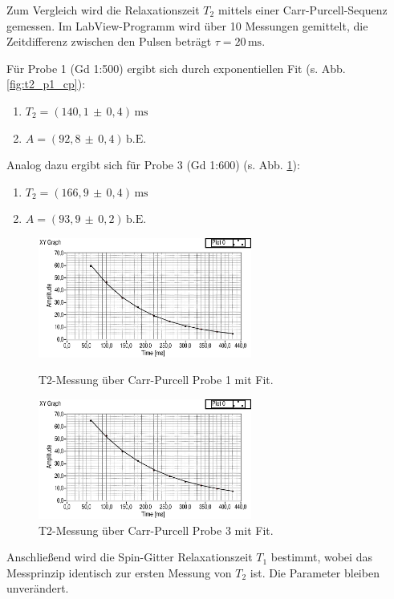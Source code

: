 \documentclass[a4paper]{scrartcl} %
\newcommand{\err}[2]{( #1 \, \pm \, #2 )} %
\newcommand{\ms}{\, \mathrm{ms}}
\newcommand{\be}{\, \mathrm{b.E.}}
\begin{document}
Zum Vergleich wird die Relaxationszeit $T_2$ mittels einer Carr-Purcell-Sequenz gemessen. Im LabView-Programm wird über 10 Messungen gemittelt, die Zeitdifferenz zwischen den Pulsen beträgt $\tau = 20\ms$.

Für Probe 1 (Gd 1:500) ergibt sich durch exponentiellen Fit (s. Abb. \ref{fig:t2_p1_cp}):
\begin{enumerate}
	\item[] $T_2 = \err{140,1}{0,4} \ms$
	\item[] $A = \err{92,8}{0,4} \be$
\end{enumerate}
Analog dazu ergibt sich für Probe 3 (Gd 1:600) (s. Abb. \ref{fig:t2_p3_cp}):
\begin{enumerate}
	\item[] $T_2 = \err{166,9}{0,4} \ms$
	\item[] $A = \err{93,9}{0,2} \be$
\end{enumerate}

\begin{figure}[H]
	\centering
	\parbox{70mm}{
		\centering
		\includegraphics[width=70mm]{./Resources/t2_p1_cp.eps}
		\caption{T2-Messung über Carr-Purcell Probe 1 mit Fit.}
		\label{fig:t2_p1_cp}
	}
	\hspace*{\fill}
	\parbox{70mm}{
		\centering
		\includegraphics[width=70mm]{./Resources/t2_p3_cp.eps}
		\caption{T2-Messung über Carr-Purcell Probe 3 mit Fit.}
		\label{fig:t2_p3_cp}
	}
\end{figure}
Anschließend wird die Spin-Gitter Relaxationszeit $T_1$ bestimmt, wobei das Messprinzip identisch zur ersten Messung von $T_2$ ist. Die Parameter bleiben unverändert.
\end{document}
